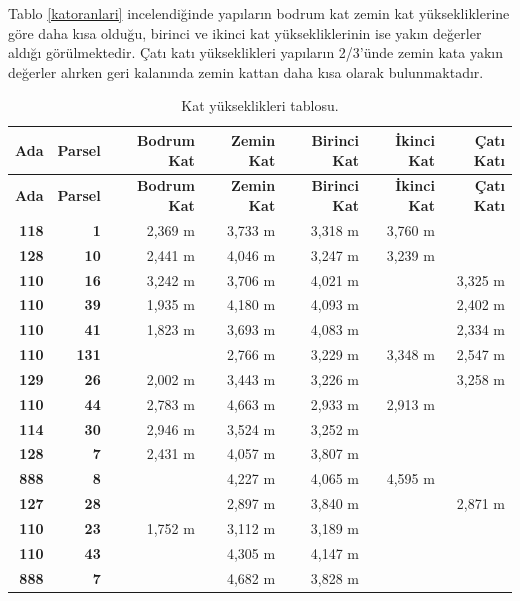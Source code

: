 \documentclass[12pt,turkish,a4paperpaper,]{report}
\begin{document}
Tablo \ref{katoranlari} incelendiğinde yapıların bodrum kat zemin kat
yüksekliklerine göre daha kısa olduğu, birinci ve ikinci kat
yüksekliklerinin ise yakın değerler aldığı görülmektedir. Çatı katı
yükseklikleri yapıların 2/3'ünde zemin kata yakın değerler alırken geri
kalanında zemin kattan daha kısa olarak bulunmaktadır.

\begin{longtable}[]{@{}rrrrrrr@{}}
\caption{Kat yükseklikleri tablosu.}\tabularnewline
\toprule
\textbf{Ada} & \textbf{Parsel} & \textbf{Bodrum Kat} & \textbf{Zemin
Kat} & \textbf{Birinci Kat} & \textbf{İkinci Kat} & \textbf{Çatı
Katı}\tabularnewline
\midrule
\endfirsthead
\toprule
\textbf{Ada} & \textbf{Parsel} & \textbf{Bodrum Kat} & \textbf{Zemin
Kat} & \textbf{Birinci Kat} & \textbf{İkinci Kat} & \textbf{Çatı
Katı}\tabularnewline
\midrule
\endhead
\textbf{118} & \textbf{1} & 2,369 m & 3,733 m & 3,318 m & 3,760 m
&\tabularnewline
\textbf{128} & \textbf{10} & 2,441 m & 4,046 m & 3,247 m & 3,239 m
&\tabularnewline
\textbf{110} & \textbf{16} & 3,242 m & 3,706 m & 4,021 m & & 3,325
m\tabularnewline
\textbf{110} & \textbf{39} & 1,935 m & 4,180 m & 4,093 m & & 2,402
m\tabularnewline
\textbf{110} & \textbf{41} & 1,823 m & 3,693 m & 4,083 m & & 2,334
m\tabularnewline
\textbf{110} & \textbf{131} & & 2,766 m & 3,229 m & 3,348 m & 2,547
m\tabularnewline
\textbf{129} & \textbf{26} & 2,002 m & 3,443 m & 3,226 m & & 3,258
m\tabularnewline
\textbf{110} & \textbf{44} & 2,783 m & 4,663 m & 2,933 m & 2,913 m
&\tabularnewline
\textbf{114} & \textbf{30} & 2,946 m & 3,524 m & 3,252 m &
&\tabularnewline
\textbf{128} & \textbf{7} & 2,431 m & 4,057 m & 3,807 m &
&\tabularnewline
\textbf{888} & \textbf{8} & & 4,227 m & 4,065 m & 4,595 m
&\tabularnewline
\textbf{127} & \textbf{28} & & 2,897 m & 3,840 m & & 2,871
m\tabularnewline
\textbf{110} & \textbf{23} & 1,752 m & 3,112 m & 3,189 m &
&\tabularnewline
\textbf{110} & \textbf{43} & & 4,305 m & 4,147 m & &\tabularnewline
\textbf{888} & \textbf{7} & & 4,682 m & 3,828 m & &\tabularnewline
\bottomrule
\end{longtable}
\end{document}
